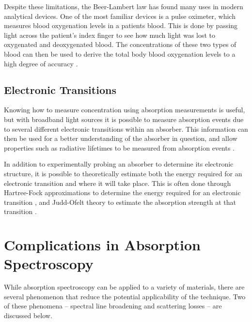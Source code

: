 Despite these limitations, the Beer-Lambert law has found many uses in modern
analytical devices. One of the most familiar devices is a pulse oximeter, which
measures blood oxygenation levels in a patients blood. This is done by passing
light across the patient's index finger to see how much light was lost to
oxygenated and deoxygenated blood. The concentrations of these two types of
blood can then be used to derive the total body blood oxygenation levels to a
high degree of accuracy \cite{Wukitsch:1987tb}.



\subsection{Electronic Transitions}\label{subsec:elec_trans}


Knowing how to measure concentration using absorption measurements is useful,
but with broadband light sources it is possible to measure absorption events
due to several different electronic transitions within an absorber. This
information can then be used for a better understanding of the absorber in
question, and allow properties such as radiative lifetimes to be measured
from absorption events \cite{Werts:2002fs}.

In addition to experimentally probing an absorber to determine its electronic
structure, it is possible to theoretically estimate both the energy required
for an electronic transition and where it will take place. This is often done
through Hartree-Fock approximations to determine the energy required for an
electronic transition \cite{Szabo:1996tu}, and Judd-Ofelt theory to estimate
the absorption strength at that transition \cite{Judd:1962uq}.



\section{Complications in Absorption Spectroscopy}\label{sec:comp_abs}

While absorption spectroscopy can be applied to a variety of materials, there
are several phenomenon that reduce the potential applicability of the
technique. Two of these phenomena -- spectral line broadening and scattering
losses -- are discussed below.



